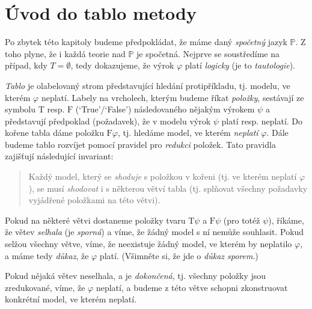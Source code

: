 \section{Úvod do tablo metody}

Po zbytek této kapitoly budeme předpokládat, že máme daný \emph{spočetný} jazyk $\mathbb P$. Z toho plyne, že i každá teorie nad $\mathbb P$ je spočetná. Nejprve se soustředíme na případ, kdy $T=\emptyset$, tedy dokazujeme, že výrok $\varphi$ platí \emph{logicky} (je to \emph{tautologie}).

\emph{Tablo} je olabelovaný strom představující hledání protipříkladu, tj. modelu, ve kterém $\varphi$ neplatí. Labely na vrcholech, kterým budeme říkat \emph{položky}, sestávají ze symbolu $\mathrm{T}$ resp. $\mathrm{F}$ (`True'/`False') následovaného nějakým výrokem $\psi$ a představují předpoklad (požadavek), že v modelu výrok $\psi$ platí resp. neplatí. Do kořene tabla dáme položku $\mathrm{F}\varphi$, tj. hledáme model, ve kterém \emph{neplatí} $\varphi$. Dále budeme tablo rozvíjet pomocí pravidel pro \emph{redukci} položek. Tato pravidla zajišťují následující invariant:
\begin{quote}
    Každý model, který se \emph{shoduje} s položkou v kořeni (tj. ve kterém neplatí $\varphi$), se musí \emph{shodovat} i s některou větví tabla (tj. splňovat všechny požadavky vyjádřené položkami na této větvi).
\end{quote}
Pokud na některé větvi dostaneme položky tvaru $\mathrm{T}\psi$ a $\mathrm{F}\psi$ (pro totéž $\psi$), říkáme, že větev \emph{selhala} (je \emph{sporná}) a víme, že žádný model s ní nemůže souhlasit. Pokud selžou všechny větve, víme, že neexistuje žádný model, ve kterém by neplatilo $\varphi$, a máme tedy \emph{důkaz}, že $\varphi$ platí. (Všimněte si, že jde o \emph{důkaz sporem}.)

Pokud nějaká větev neselhala, a je \emph{dokončená}, tj. všechny položky jsou zredukované, víme, že $\varphi$ neplatí, a budeme z této větve schopni zkonstruovat konkrétní model, ve kterém neplatí.


